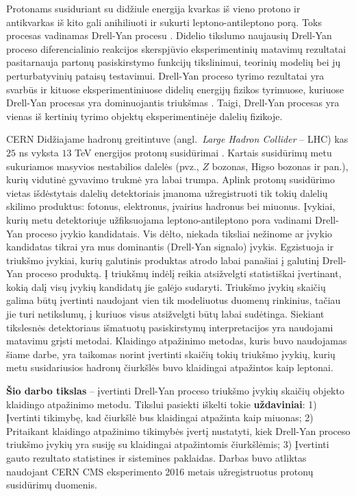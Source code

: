\documentclass[a4paper, 12pt, oneside]{article}
\begin{document}
Protonams susiduriant su didžiule energija kvarkas iš vieno protono ir antikvarkas iš kito gali anihiliuoti
ir sukurti leptono-antileptono porą.
Toks procesas vadinamas Drell-Yan procesu \cite{DYoriginal}.
Didelio tikslumo naujausių Drell-Yan proceso diferencialinio reakcijos skerspjūvio eksperimentinių matavimų
rezultatai \cite{DY2013, DY7TeVatlas, DY2015, DY8TeVatlas, DY2019} pasitarnauja partonų pasiskirstymo funkcijų
tikslinimui, teorinių modelių bei jų perturbatyvinių pataisų testavimui.
Drell-Yan proceso tyrimo rezultatai yra svarbūs ir kituose eksperimentiniuose didelių energijų fizikos
tyrimuose, kuriuose Drell-Yan procesas yra dominuojantis triukšmas \cite{Higgs2018, Zprime, SUSYtau}.
Taigi, Drell-Yan procesas yra vienas iš  kertinių tyrimo objektų eksperimentinėje dalelių fizikoje.

CERN Didžiajame hadronų greitintuve (angl.\ \textit{Large Hadron Collider} -- LHC) kas $25$ ns vyksta $13$ TeV
energijos protonų susidūrimai \cite{LHC_13TeV_25ns}.
Kartais susidūrimų metu sukuriamos masyvios nestabilios dalelės (pvz., $Z$ bozonas, Higso bozonas ir pan.),
kurių vidutinė gyvavimo trukmė yra labai trumpa.
Aplink protonų susidūrimo vietas išdėstytais dalelių detektoriais įmanoma užregistruoti tik tokių
dalelių skilimo produktus: fotonus, elektronus, įvairius hadronus bei miuonus.
Įvykiai, kurių metu detektoriuje užfiksuojama leptono-antileptono pora vadinami Drell-Yan proceso įvykio kandidatais.
Vis dėlto, niekada tiksliai nežinome ar įvykio kandidatas tikrai yra mus dominantis (Drell-Yan signalo) įvykis.
Egzistuoja ir triukšmo įvykiai, kurių galutinis produktas atrodo labai panašiai į galutinį Drell-Yan proceso produktą.
Į triukšmų indėlį reikia atsižvelgti statistiškai įvertinant, kokią dalį visų įvykių kandidatų jie galėjo sudaryti.
Triukšmo įvykių skaičių galima būtų įvertinti naudojant vien tik modeliuotus duomenų rinkinius, tačiau jie turi
netikslumų, į kuriuos visus atsižvelgti būtų labai sudėtinga.
Siekiant tikslesnės detektoriaus išmatuotų pasiskirstymų interpretacijos yra naudojami matavimu grįsti metodai.
Klaidingo atpažinimo metodas, kuris buvo naudojamas šiame darbe, yra taikomas norint įvertinti skaičių tokių triukšmo
įvykių, kurių metu susidariusios hadronų čiurkšlės buvo klaidingai atpažintos kaip leptonai.


\textbf{Šio darbo tikslas} -- įvertinti Drell-Yan proceso triukšmo įvykių skaičių objekto klaidingo atpažinimo metodu.
Tikslui pasiekti iškelti tokie \textbf{uždaviniai}:
1) Įvertinti tikimybę, kad čiurkšlė bus klaidingai atpažinta kaip miuonas;
2) Pritaikant klaidingo atpažinimo tikimybės įvertį nustatyti, kiek Drell-Yan proceso triukšmo įvykių yra susiję su
klaidingai atpažintomis čiurkšlėmis;
3) Įvertinti gauto rezultato statistines ir sistemines paklaidas.
Darbas buvo atliktas naudojant CERN CMS eksperimento 2016 metais užregistruotus protonų susidūrimų duomenis.
\end{document}
